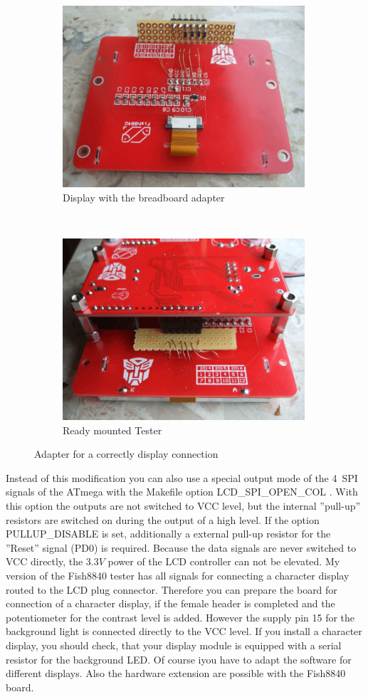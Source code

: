 \begin{figure}[H]
  \begin{subfigure}[b]{9cm}
    \centering
    \includegraphics[width=9cm]{../PNG/Fish8840Adapt1.jpg}
    \caption{Display with the breadboard adapter}
  \end{subfigure}
  ~
  \begin{subfigure}[b]{9cm}
    \centering
    \includegraphics[width=9cm]{../PNG/Fish8840Adapt2.jpg}
    \caption{Ready mounted Tester}
  \end{subfigure}
  \caption{Adapter for a correctly display connection}
  \label{fig:Fish8840Adapt}
\end{figure}

Instead of this modification you can also use a special output mode of the 4~SPI signals of the ATmega
with the Makefile option LCD\_SPI\_OPEN\_COL .
With this option the outputs are not switched to VCC level,
but the internal ''pull-up'' resistors are switched on during the output of a high level.
If the option PULLUP\_DISABLE is set, additionally a external pull-up resistor for
the ''Reset'' signal (PD0) is required.
Because the data signals are never switched to VCC directly, the \(3.3V\) power of the LCD controller
can not be elevated.
My version of the Fish8840 tester has all signals for connecting a character display
routed to the LCD plug connector.
Therefore you can prepare the board for connection of a character display, if the
female header is completed and the potentiometer for the contrast level is added.
However the supply pin 15 for the background light is connected directly to the VCC level.
If you install a character display, you should check, that your display module
is equipped with a serial resistor for the background LED.
Of course iyou have to adapt the software for different displays. 
Also the hardware extension are possible with the Fish8840 board.\\

